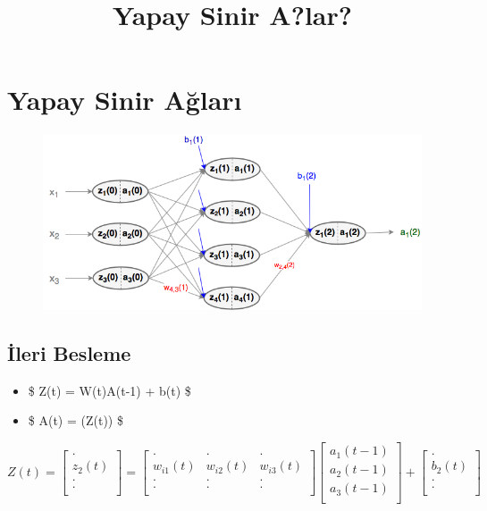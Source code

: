 \documentclass[11pt]{article}
\title{Yapay Sinir A?lar?}
\makeatletter
\def\maxwidth{\ifdim\Gin@nat@width>\linewidth\linewidth
    \else\Gin@nat@width\fi}
\let\Oldincludegraphics\includegraphics
\renewcommand{\includegraphics}[1]{\Oldincludegraphics[width=.8\maxwidth]{#1}}
\providecommand{\tightlist}{%
      \setlength{\itemsep}{0pt}\setlength{\parskip}{0pt}}
\makeatother
\begin{document}
    
    
    \maketitle
    
    

    
    \section{Yapay Sinir Ağları}\label{yapay-sinir-aux11flarux131}

\begin{figure}
\centering
\includegraphics{network.png}
\caption{}
\end{figure}

\subsection{İleri Besleme}\label{ileri-besleme}

\begin{itemize}
\tightlist
\item
  \$ Z(t) = W(t)A(t-1) + b(t) \$
\item
  \$ A(t) = \sigma(Z(t)) \$
\end{itemize}

\[
Z(t) = 
\begin{bmatrix}
. \\
z_2(t) \\
. \\
. \\
\end{bmatrix}
=
\begin{bmatrix}
.       & . & . \\
 w_{i1}(t)       & w_{i2}(t)  & w_{i3}(t)  \\
.       & . & . \\
.       & . & . \\
\end{bmatrix}
\begin{bmatrix}
a_1(t-1) \\
a_2(t-1)\\
a_3(t-1)\\
\end{bmatrix}
+
\begin{bmatrix}
. \\
b_2(t) \\
. \\
. \\
\end{bmatrix}
\]
\end{document}
